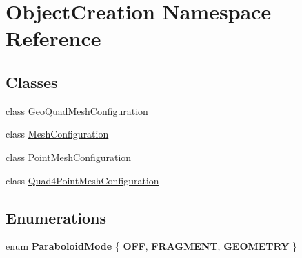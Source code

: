 \hypertarget{namespace_object_creation}{}\section{Object\+Creation Namespace Reference}
\label{namespace_object_creation}
\subsection*{Classes}
\begin{DoxyCompactItemize}
\item 
class \hyperlink{class_object_creation_1_1_geo_quad_mesh_configuration}{Geo\+Quad\+Mesh\+Configuration}
\item 
class \hyperlink{class_object_creation_1_1_mesh_configuration}{Mesh\+Configuration}
\item 
class \hyperlink{class_object_creation_1_1_point_mesh_configuration}{Point\+Mesh\+Configuration}
\item 
class \hyperlink{class_object_creation_1_1_quad4_point_mesh_configuration}{Quad4\+Point\+Mesh\+Configuration}
\end{DoxyCompactItemize}
\subsection*{Enumerations}
\begin{DoxyCompactItemize}
\item 
\mbox{\label{namespace_object_creation_ae9f2d40345196abd94e2761f00d99f6f}} 
enum {\bfseries Paraboloid\+Mode} \{ {\bfseries O\+FF}, 
{\bfseries F\+R\+A\+G\+M\+E\+NT}, 
{\bfseries G\+E\+O\+M\+E\+T\+RY}
 \}
\end{DoxyCompactItemize}

